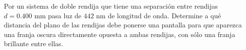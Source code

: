 \item Por un sistema de doble rendija que tiene una separación entre rendijas $d = 0.400\text{ mm}$ pasa luz de $442\text{ nm}$ de longitud de onda. Determine a qué distancia del plano de las rendijas debe ponerse una pantalla para que aparezca una franja oscura directamente opuesta a ambas rendijas, con sólo una franja brillante entre ellas.